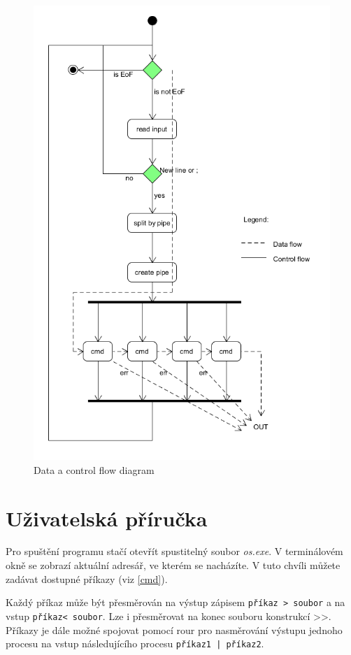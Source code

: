 \documentclass[a4paper]{article}
\begin{document}
\begin{figure}[!h] 
\centering
 \includegraphics[width=1\textwidth]{./flow2.png}
\caption{Data a control flow diagram}
\end{figure}
\newpage

\section{Uživatelská příručka}
Pro spuštění programu stačí otevřít spustitelný soubor \emph{os.exe}. V terminálovém okně se zobrazí aktuální adresář, ve kterém se nacházíte. V tuto chvíli můžete zadávat dostupné příkazy (viz \ref{cmd}).


Každý příkaz může být přesměrován na výstup zápisem  \verb+příkaz > soubor+ a na vstup  \verb+příkaz< soubor+. Lze i přesměrovat na konec souboru konstrukcí \textgreater\textgreater. Příkazy je dále možné spojovat pomocí rour pro nasměrování výstupu jednoho procesu na vstup následujícího procesu  \verb+příkaz1 | příkaz2+.
\end{document}
